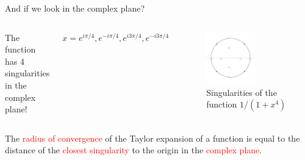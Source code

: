\documentclass[xcolor=x11names,compress]{beamer}
\renewcommand{\(}{\begin{columns}}
\renewcommand{\)}{\end{columns}}
\newcommand{\<}[1]{\begin{column}{#1}}
\renewcommand{\>}{\end{column}}
\begin{document}
\begin{frame}{And if we look in the complex plane?}

\begin{columns}


\centering The function has 4 singularities in the complex plane!

\vspace{1cm}

$x = e^{i\pi/4}, e^{-i\pi/4}, e^{i3\pi/4}, e^{-i3\pi/4}$


\begin{figure}
    \centering
    \includegraphics[width=0.6\textwidth]{possingu.pdf}
    \caption{\centering Singularities of the function $1/(1+x^4)$}
    \label{fig:my_label}
\end{figure}

\end{columns}

The \textcolor{red}{radius of convergence} of the Taylor expansion of a function is equal to the distance of the \textcolor{red}{closest singularity} to the origin in the \textcolor{red}{complex plane}.
    
\end{frame}
\end{document}
